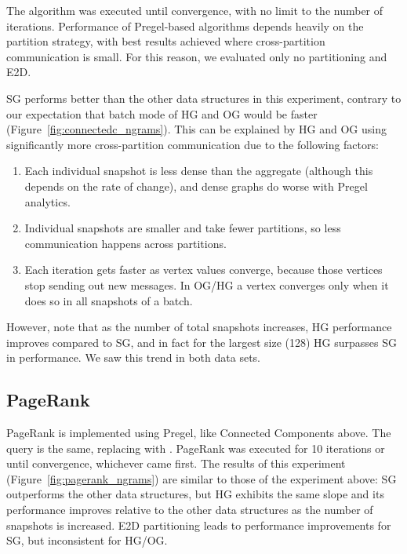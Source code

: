 The algorithm was executed until convergence, with no limit to the
number of iterations.  Performance of Pregel-based algorithms depends
heavily on the partition strategy, with best results achieved where
cross-partition communication is small.  For this reason, we evaluated
only no partitioning and E2D.

SG performs better than the other data structures in this experiment,
contrary to our expectation that batch mode of HG and OG would be
faster (Figure~\ref{fig:connectedc_ngrams}).  This can be explained by
HG and OG using significantly more cross-partition communication due
to the following factors:

\begin{enumerate}[leftmargin=*]
\item Each individual snapshot is less dense than the aggregate
  (although this depends on the rate of change), and dense graphs do
  worse with Pregel analytics.
\item Individual snapshots are smaller and take fewer partitions, so
  less communication happens across partitions.
\item Each iteration gets faster as vertex values converge, because
  those vertices stop sending out new messages.  In OG/HG a vertex
  converges only when it does so in all snapshots of a batch.
\end{enumerate}

However, note that as the number of total snapshots increases, HG
performance improves compared to SG, and in fact for the largest size
(128) HG surpasses SG in performance.  We saw this trend in both data
sets.

\subsection{PageRank}

PageRank is implemented using Pregel, like Connected Components above.
The query is the same, replacing  with
.  PageRank was executed for 10 iterations or until
convergence, whichever came first.  The results of this experiment
(Figure~\ref{fig:pagerank_ngrams}) are similar to those of the
experiment above: SG outperforms the other data structures, but HG
exhibits the same slope and its performance improves relative to the
other data structures as the number of snapshots is increased.  E2D
partitioning leads to performance improvements for SG, but
inconsistent for HG/OG.

